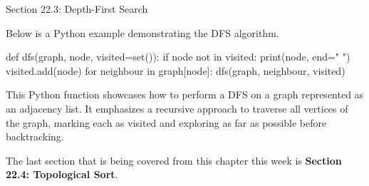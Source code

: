 \begin{notes}{Section 22.3: Depth-First Search}
    \begin{highlight}
        Below is a Python example demonstrating the DFS algorithm.
    \begin{code}[Python]
    def dfs(graph, node, visited=set()):
        if node not in visited:
            print(node, end=" ")
            visited.add(node)
            for neighbour in graph[node]:
                dfs(graph, neighbour, visited)
    \end{code}
    
        This Python function showcases how to perform a DFS on a graph represented as an adjacency list. It emphasizes a recursive approach to traverse all vertices of the graph, marking each as visited 
        and exploring as far as possible before backtracking.
    \end{highlight}    
\end{notes}

The last section that is being covered from this chapter this week is \textbf{Section 22.4: Topological Sort}.

